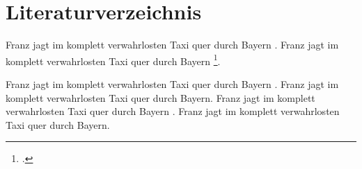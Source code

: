 \documentclass[10pt, a4paper]{article}
\begin{document}
\tableofcontents
\section{Literaturverzeichnis}
Franz jagt im komplett verwahrlosten Taxi quer durch Bayern \parencite[siehe][S. 12-14]{lkgt}. Franz jagt im komplett verwahrlosten Taxi quer durch Bayern \footcite[siehe][Kapitel 3. Seite 455]{bworld}.

Franz jagt im komplett verwahrlosten Taxi quer durch Bayern \parencite{dlb,lkgt}.  Franz jagt im komplett verwahrlosten Taxi quer durch Bayern.  Franz jagt im komplett verwahrlosten Taxi quer durch Bayern \parencite{article1}. Franz jagt im komplett verwahrlosten Taxi quer durch Bayern.


\printbibliography
\end{document}
